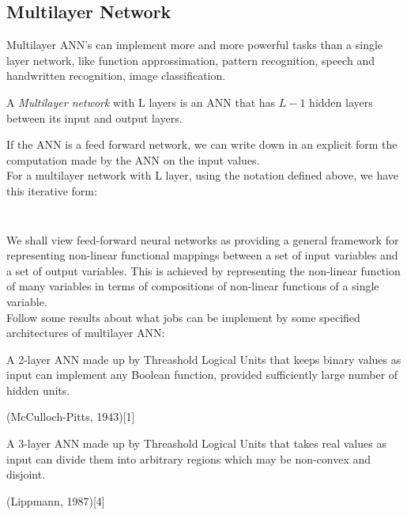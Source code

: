 	
\subsection{Multilayer Network}

Multilayer ANN's can implement more  and more powerful tasks than a single layer network, like function approssimation, pattern recognition, speech and handwritten recognition, image classification.

\begin{defn}
	A \emph{Multilayer network} with L layers is an ANN that has $L-1$ hidden layers between its input and output layers.
\end{defn}

If the ANN is a feed forward network, we can write down in an explicit form the computation made by the ANN on the input values.\\
For a multilayer network with L layer, using the notation defined above, we have this iterative form:

$$\begin{cases} Z^0=X \\
 Z^i=(\varphi_i(\bar{w}^i_1 \times {}^TZ^{(i-1)}),...,\varphi_i(\bar{w}^i_k} \times {}^TZ^{(i-1)} )) \\
 Y(X)=Z^L \end{cases}$$

We shall view feed-forward neural networks as providing a general framework for  representing non-linear functional mappings between a set of input variables and a set of output variables. This is achieved by representing the non-linear function of many variables in terms of compositions of non-linear functions of a single variable.\\

Follow some results about what jobs can be implement by some specified architectures of multilayer ANN:\\


\begin{theo}
	A 2-layer ANN made up by Threashold Logical Units that keeps binary values as input can implement any Boolean function, provided sufficiently large number of hidden units. 
\end{theo}
(McCulloch-Pitts, 1943)[1]
{}\\
 
\begin{theo}
	A 3-layer ANN made up by Threashold Logical Units that takes real values as input can divide them into arbitrary regions which  may  be  non-convex  and  disjoint.
\end{theo}
(Lippmann, 1987)[4]
{}\\


